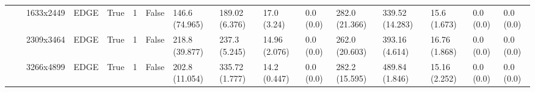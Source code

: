 \begin{tabular}{llllllllllllllll}
                  &      & 1633x2449 & EDGE & True &          1 &  False &  146.6 (74.965) &         189.02 (6.376) &      17.0 (3.24) &                0.0 (0.0) &          282.0 (21.366) &           339.52 (14.283) &        15.6 (1.673) &                        0.0 (0.0) &                          0.0 (0.0) \\
                  &      & 2309x3464 & EDGE & True &          1 &  False &  218.8 (39.877) &          237.3 (5.245) &    14.96 (2.076) &                0.0 (0.0) &          262.0 (20.603) &            393.16 (4.614) &       16.76 (1.868) &                        0.0 (0.0) &                          0.0 (0.0) \\
                  &      & 3266x4899 & EDGE & True &          1 &  False &  202.8 (11.054) &         335.72 (1.777) &     14.2 (0.447) &                0.0 (0.0) &          282.2 (15.595) &            489.84 (1.846) &       15.16 (2.252) &                        0.0 (0.0) &                          0.0 (0.0) \\
\bottomrule
\end{tabular}
\begin{comment}
\begin{tabular}{lllllll|lll|llllll}
\toprule
                  &       &      &           & batch\_size &   GPU & NNAPI &  prepro\_latency & prepro\_memory & prepro\_CPU\_usage & inf\_server\_latency & inf\_total\_latency & inf\_memory & inf\_CPU & inf\_network\_up & inf\_network\_down \\
model & inf\_mode & prepro\_flag & image\_size &            &       &       &                 &                        &                  &                          &                         &                           &                     &                                  &                                    \\
\midrule
\end{tabular}
\end{comment}
